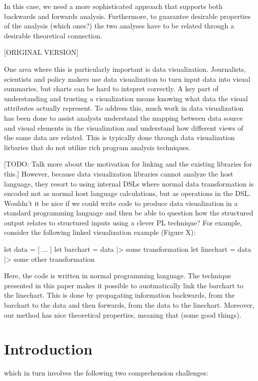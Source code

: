In this case, we need a more sophisticated approach that supports both backwards and forwards analysis. Furthermore, to guarantee desirable properties of the analysis (which ones?) the two analyses have to be related through a desirable theoretical connection.

[ORIGINAL VERSION]

One area where this is particularly important is data visualization. Journalists, scientists and policy makers use data visualization to turn input data into visual summaries, but charts can be hard to intepret correctly. A key part of understanding and trusting a visualization means knowing what data the visual attributes actually represent. To address this, much work in data visualization has been done to assist analysts understand the mapping between data source and visual elements in the visualization and understand how different views of the same data are related. This is typically done through data visualization lirbaries that do not utilize rich program analysis techniques.

[TODO: Talk more about the motivation for linking and the existing libraries for this.]
However, because data visualization libraries cannot analyze the host language, they resort to using internal DSLs where normal data transformation is encoded not as normal host language calculations, but as operations in the DSL. Wouldn't it be nice if we could write code to produce data visualization in a standard programming language and then be able to question how the structured output relates to structured inputs using a clever PL technique? For example, consider the following linked visualization example (Figure X):

let data = [ ... ]
let barchart = data |> some transformation
let linechart = data |> some other transformation

Here, the code is written in normal programming language. The technique presented in this paper makes it possible to auotmatically link the barchart to the linechart. This is done by propagating information backwards, from the barchart to the data and then forwards, from the data to the linechart. Moreover, our method has nice theoretical properties, meaning that (some good things).

\section{Introduction}

which in turn involves the following two comprehension challenges:

